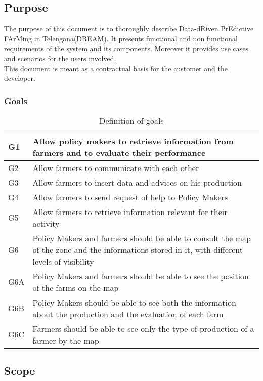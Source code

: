 \subsection{Purpose}
The purpose of this document is to thoroughly describe 
Data-dRiven PrEdictive FArMing in Telengana(DREAM).
It presents functional and non functional requirements of the system and its components.
Moreover it provides use cases and scenarios for the users involved.
\\This document is meant as a contractual basis for the customer and the developer.

\subsubsection{Goals}\label{section:1.1.1}
  \begin{table}[h]
        \centering
  \begin{tabular}{|p{2cm}|p{9cm}|}
    \hline
    G1 & Allow policy makers to retrieve information from farmers and to evaluate their performance\\
    \hline
    G2 & Allow farmers to communicate with each other\\
    \hline
    G3 & Allow farmers to insert data and advices on his production\\
    \hline
    G4 & Allow farmers to send request of help to Policy Makers\\
    \hline
    G5 & Allow farmers to retrieve information relevant for their activity\\
    \hline
    G6 & Policy Makers and farmers should be able to consult the map of the zone and the informations stored in it, with different levels of visibility\\
    \hline
    G6A & Policy Makers and farmers should be able to see the position of the farms on the map\\
    \hline
    G6B & Policy Makers should be able to see both the information about the production and the evaluation of each farm\\
    \hline
    G6C & Farmers should be able to see only the type of production of a farmer by the map\\
    \hline
  \end{tabular}
  \caption{Definition of goals}
\end{table}

\subsection{Scope}

